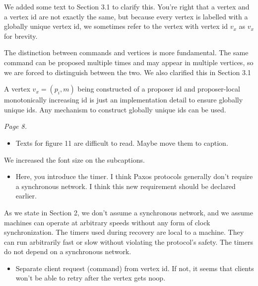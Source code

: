 \documentclass[letterpaper,twocolumn,10pt]{article}
\newenvironment{reviewerquote}
{\list{}{\leftmargin=\parindent\rightmargin=0in}\item[] \itshape \color{ReviewerDarkGray}}%
{\endlist}
\begin{document}
We added some text to Section 3.1 to clarify this. You're right that a vertex
and a vertex id are not exactly the same, but because every vertex is labelled
with a globally unique vertex id, we sometimes refer to the vertex with vertex
id $v_x$ as $v_x$ for brevity.

The distinction between commands and vertices is more fundamental. The same
command can be proposed multiple times and may appear in multiple vertices, so
we are forced to distinguish between the two. We also clarified this in Section
3.1

A vertex $v_x = (p_i, m)$ being constructed of a proposer id and proposer-local
monotonically increasing id is just an implementation detail to ensure globally
unique ids. Any mechanism to construct globally unique ids can be used.

\begin{reviewerquote}
  Page 8.

  \begin{itemize}
    \item
      Texts for figure 11 are difficult to read. Maybe move them to caption.
  \end{itemize}
\end{reviewerquote}

We increased the font size on the subcaptions.

\begin{reviewerquote}
  \begin{itemize}
    \item
      Here, you introduce the timer. I think Paxos protocols generally don't
      require a synchronous network. I think this new requirement should be
      declared earlier.
  \end{itemize}
\end{reviewerquote}

As we state in Section 2, we don't assume a synchronous network, and we assume
machines can operate at arbitrary speeds without any form of clock
synchronization. The timers used during recovery are local to a machine. They
can run arbitrarily fast or slow without violating the protocol's safety. The
timers do not depend on a synchronous network.

\begin{reviewerquote}
  \begin{itemize}
    \item
      Separate client request (command) from vertex id. If not, it seems that
      clients won't be able to retry after the vertex gets noop.
  \end{itemize}
\end{reviewerquote}
\end{document}

